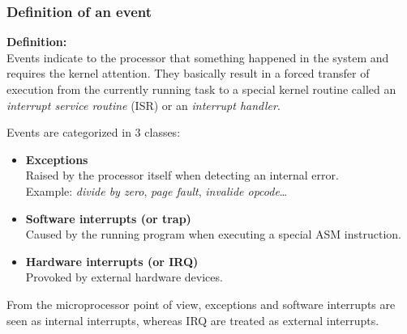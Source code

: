 \begin{frame}
  \frametitle{Definition of an event}

  {\bf Definition:}\\
  Events indicate to the processor that something happened in the system
  and requires the kernel attention. They basically result in a forced transfer of
  execution from the currently running task to a special kernel routine  called
  an {\em interrupt service routine} (ISR) or an {\em interrupt handler}.\\

  \-

  Events are categorized in 3 classes:

  \begin{itemize}
    \item {\bf Exceptions}\\
      Raised by the processor itself when detecting an internal error.\\
      Example: {\em divide by zero}, {\em page fault}, {\em invalide opcode}\ldots
    \item {\bf Software interrupts (or trap)}\\
      Caused by the running program when executing a special ASM instruction.
    \item {\bf Hardware interrupts (or IRQ)}\\
      Provoked by external hardware devices.
  \end{itemize}

  \-

  From the microprocessor point of view, exceptions and software interrupts are
  seen as internal interrupts, whereas IRQ are treated as external interrupts.

\end{frame}

%
%
%

